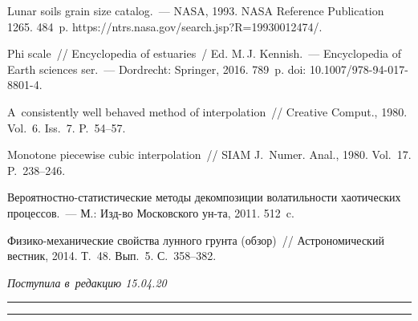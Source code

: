 \begin{multicols}{2}
{{\begin{thebibliography}{99}
 Lunar soils grain size catalog.~--- NASA, 1993. 
NASA Reference 
Publication 1265. 484~p.
{\sf  
https://ntrs.nasa.gov/search.jsp?R=19930012474/}.

 Phi scale~// Encyclopedia of estuaries~/ 
Ed. M.\,J. Kennish.~--- Encyclopedia of Earth sciences ser.~---
Dordrecht: Springer, 2016. 789~p. doi: 10.1007/978-94-017-8801-4.

 A~consistently well behaved method of 
interpolation~// Creative Comput., 1980. Vol.~6. Iss.~7. P.~54--57.

 Monotone piecewise cubic 
interpolation~// SIAM J.~Numer. Anal., 1980. Vol.~17. P.~238--246.

 Ве\-ро\-ят\-ност\-но-ста\-ти\-сти\-че\-ские методы 
декомпозиции волатильности хаотических процессов.~--- М.:  
Изд-во Московского ун-та, 2011. 512~c.

 Фи\-зи\-ко-ме\-ха\-ни\-че\-ские свойства лунного грунта 
(обзор)~// Астрономический вестник, 2014. Т.~48. Вып.~5. С.~358--382.

\end{thebibliography}

 }
 }

\end{multicols}

\vspace*{-6pt}

\hfill{\small\textit{Поступила в~редакцию 15.04.20}}

\vspace*{8pt}




\hrule

\vspace*{2pt}

\hrule


\def\tit{APPROXIMATION OF PARTICLE SIZE DISTRIBUTIONS\\ OF~LUNAR REGOLITH 
BASED ON~THE~RESAMPLING}


\def\titkol{Approximation of particle size distributions of lunar 
regolith based on the
resampling}

